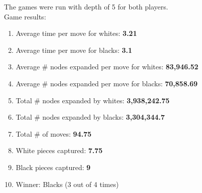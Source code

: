 \documentclass[11pt]{article}
\begin{document}
The games were run with depth of 5 for both players.\\
Game results:\\
\begin{enumerate}
\item Average time per move for whites: \textbf{3.21}
\item Average time per move for blacks: \textbf{3.1}
\item Average \# nodes expanded per move for whites: \textbf{83,946.52}
\item Average \# nodes expanded per move for blacks:  \textbf{70,858.69}
\item Total \# nodes expanded by whites: \textbf{3,938,242.75}
\item Total \# nodes expanded by blacks: \textbf{3,304,344.7}
\item Total \# of moves: \textbf{94.75}
\item White pieces captured: \textbf{7.75}
\item Black pieces captured: \textbf{9}
\item Winner: Blacks (3 out of 4 times)
\end{enumerate}
\end{document}
